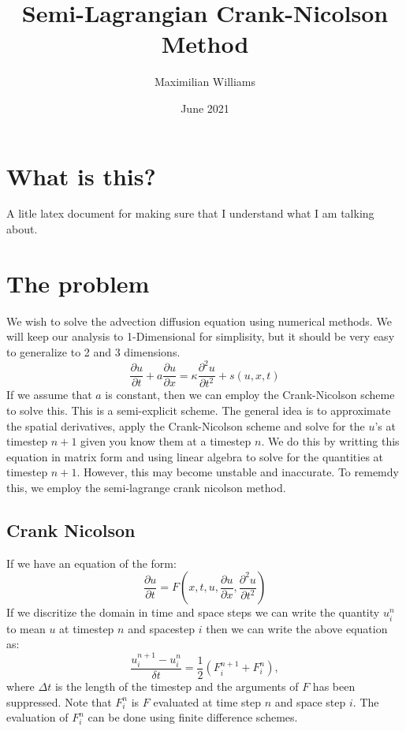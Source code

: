 \documentclass{article}
\title{Semi-Lagrangian Crank-Nicolson Method}
\author{Maximilian Williams}
\date{June 2021}
\begin{document}
\maketitle

\section*{What is this?}
A litle latex document for making sure that I understand what I am talking about.


\section*{The problem}
We wish to solve the advection diffusion equation using numerical methods. We will keep our analysis to 1-Dimensional for simplisity, but it should be very easy to generalize to 2 and 3 dimensions.
\begin{equation}
	\frac{\partial u}{\partial t} + a \frac{\partial u}{\partial x} = \kappa \frac{\partial^2 u}{\partial t^2} + s(u,x,t)
\end{equation}
If we assume that $a$ is constant, then we can employ the Crank-Nicolson scheme to solve this. This is a semi-explicit scheme. The general idea is to approximate the spatial derivatives, apply the Crank-Nicolson scheme and solve for the $u$'s
at timestep $n+1$ given you know them at a timestep $n$. We do this by writting this equation in matrix form and using linear algebra to solve for the quantities at timestep $n+1$. However, this may become unstable and inaccurate. To rememdy this, we employ the semi-lagrange crank nicolson method.

\subsection*{Crank Nicolson}
If we have an equation of the form:
\begin{equation}
	\frac{\partial u}{\partial t} = F(x,t,u,\frac{\partial u}{\partial x}, \frac{\partial^2 u }{\partial t^2} )
\end{equation}
If we discritize the domain in time and space steps we can write the quantity $u^{n}_i$ to mean $u$ at timestep $n$ and spacestep $i$ then we can write the above equation as:
\begin{equation}
	\frac{u^{n+1}_i - u^{n}_i}{\delta t} = \frac{1}{2} (F^{n+1}_{i} + F^{n}_i), 
\end{equation}
where $\Delta t$ is the length of the timestep and the arguments of $F$ has been suppressed. Note that $F^{n}_i$ is $F$ evaluated at time step $n$ and space step $i$. The evaluation of $F^{n}_i$ can be done using finite difference schemes. 
\end{document}
